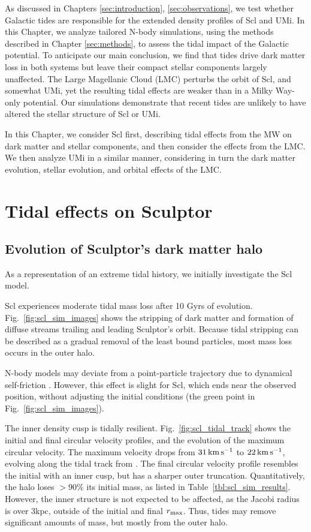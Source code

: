 As discussed in Chapters \ref{sec:introduction}, \ref{sec:observations},
we test whether Galactic tides are responsible for the extended density
profiles of Scl and UMi. In this Chapter, we analyze tailored N-body
simulations, using the methods described in Chapter \ref{sec:methods},
to assess the tidal impact of the Galactic potential. To anticipate our
main conclusion, we find that tides drive dark matter loss in both
systems but leave their compact stellar components largely unaffected.
The Large Magellanic Cloud (LMC) perturbs the orbit of Scl, and somewhat
UMi, yet the resulting tidal effects are weaker than in a Milky Way-only
potential. Our simulations demonstrate that recent tides are unlikely to
have altered the stellar structure of Scl or UMi.

In this Chapter, we consider Scl first, describing tidal effects from
the MW on dark matter and stellar components, and then consider the
effects from the LMC. We then analyze UMi in a similar manner,
considering in turn the dark matter evolution, stellar evolution, and
orbital effects of the LMC.

\section{Tidal effects on Sculptor}\label{tidal-effects-on-sculptor}

\subsection{Evolution of Sculptor's dark matter
halo}\label{evolution-of-sculptors-dark-matter-halo}

As a representation of an extreme tidal history, we initially
investigate the \smallperi{} Scl model.

Scl experiences moderate tidal mass loss after 10 Gyrs of evolution.
Fig.~\ref{fig:scl_sim_images} shows the stripping of dark matter and
formation of diffuse streams trailing and leading Sculptor's orbit.
Because tidal stripping can be described as a gradual removal of the
least bound particles, most mass loss occurs in the outer halo.

N-body models may deviate from a point-particle trajectory due to
dynamical self-friction \citep[e.g.,][]{white1983, miller+2020}.
However, this effect is slight for Scl, which ends near the observed
position, without adjusting the initial conditions (the green point in
Fig.~\ref{fig:scl_sim_images}).

The inner density cusp is tidally resilient.
Fig.~\ref{fig:scl_tidal_track} shows the initial and final circular
velocity profiles, and the evolution of the maximum circular velocity.
The maximum velocity drops from \(31\,{\rm km\,s^{-1}}\) to \(22\,{\rm km\,s^{-1}}\), evolving
along the tidal track from \citet{EN2021}. The final circular velocity
profile resembles the initial with an inner cusp, but has a sharper
outer truncation. Quantitatively, the halo loses \(>90\%\) its initial
mass, as listed in Table~\ref{tbl:scl_sim_results}. However, the inner
structure is not expected to be affected, as the Jacobi radius is over
3kpc, outside of the initial and final \(r_{\rm max}\). Thus, tides may remove
significant amounts of mass, but mostly from the outer halo.

